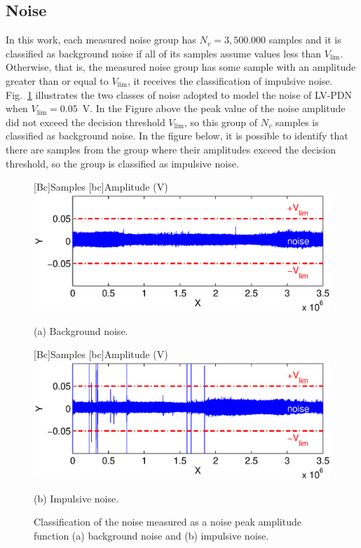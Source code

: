 \documentclass[journal]{IEEEtran}
\begin{document}
	\subsection{Noise}\label{sec-ruido}
	In this work, each measured noise group has $N_v=3,500.000$ samples and it is classified as background noise if all of its samples assume values less than $V_{\lim}$. Otherwise, that is, the measured noise group has some sample with an amplitude greater than or equal to $V_{\lim}$, it receives the classification of impulsive noise. Fig.~\ref{Fig:limiteDeciRuidos} illustrates the two classes of noise adopted to model the noise of \ac{LV-PDN} when $V_{\lim}=0.05$~V. In the Figure above the peak value of the noise amplitude did not exceed the decision threshold $V_{\lim}$, so this group of $N_v$ samples is classified as background noise. In the figure below, it is possible to identify that there are samples from the group where their amplitudes exceed the decision threshold, so the group is classified as impulsive noise. 
	\begin{figure} [!htb]
		\begin{minipage}[b]{\linewidth}
			[Bc]{Samples}    
			[bc]{Amplitude (V)}
			\includegraphics[width=\linewidth]{Figuras/limiteDeciRuidoRimpuls11.eps}
			\begin{center} \vspace{-.4cm}
				(a) Background noise.
			\end{center}
			\vfill
		\end{minipage} 
		\begin{minipage}[b]{\linewidth}
			[Bc]{Samples}    
			[bc]{Amplitude (V)}
			\includegraphics[width=\linewidth]{Figuras/limiteDeciRuidoRimpuls6.eps}
			\begin{center}\vspace{-.4cm}
				(b) Impulsive noise.
			\end{center}
			
		\end{minipage}
		\caption{Classification of the noise measured as a noise peak amplitude function  (a) background noise and (b) impulsive noise.}
		\label{Fig:limiteDeciRuidos}
	\end{figure}
	
\end{document}
